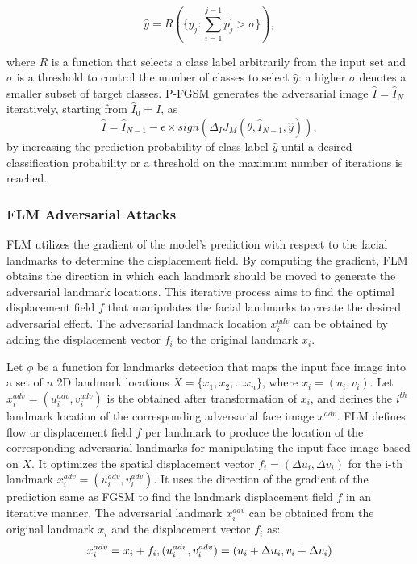 \documentclass[sn-mathphys]{sn-jnl}%
\theoremstyle{thmstyleone}%
\theoremstyle{thmstyletwo}%
\theoremstyle{thmstylethree}%
\begin{document}
\begin{equation}
 \hat y = R (\{y_j: \sum_{i=1}^{j-1} p^{\prime}_j > \sigma \}),
\end{equation}

where $R$ is a function that selects a class label arbitrarily from the input set and $\sigma$ is a threshold to control the number of classes to select $\hat y$: a higher $\sigma$ denotes a smaller subset of target classes. P-FGSM generates the adversarial image $ \hat I = \hat I_N$ iteratively, starting from $\hat I_0 = I$, as
\begin{equation}
 \hat I = \hat I_{N-1} - \epsilon \times sign(\Delta_I J_M(\theta, \hat I_{N-1}, \hat y)),
\end{equation}
by increasing the prediction probability of class label $\hat y$ until a desired classification probability or a threshold on the maximum number of iterations is reached.

\subsubsection{FLM Adversarial Attacks} 
FLM utilizes the gradient of the model's prediction with respect to the facial landmarks to determine the displacement field. By computing the gradient, FLM obtains the direction in which each landmark should be moved to generate the adversarial landmark locations. This iterative process aims to find the optimal displacement field $f$ that manipulates the facial landmarks to create the desired adversarial effect. The adversarial landmark location $x_i^{adv}$ can be obtained by adding the displacement vector $f_i$ to the original landmark $x_i$.

Let $\phi$ be a function for landmarks detection that maps the input face image into a set of $n$ 2D landmark locations $X = \{x_1, x_2,...x_n\}$, where $x_i = (u_i, v_i)$. Let $x^{adv}_i = (u^{adv}_i, v^{adv}_i)$ is the obtained after transformation of $x_i$, and defines the $i^{th}$ landmark location of the corresponding adversarial face image $x^{adv}$. FLM defines flow or displacement field $f$ per landmark to produce the location of the corresponding adversarial landmarks for manipulating the input face image based on $X$. It optimizes the spatial displacement vector $f_i = (\Delta u_i, \Delta v_i)$ for the i-th landmark $x^{adv}_i = (u^{adv}_i, v^{adv}_i)$. It uses the direction of the gradient of the prediction same as FGSM \cite{goodfellow2014explaining} to find the landmark displacement field $f$ in an iterative manner. The adversarial landmark $x^{adv}_i$ can be obtained from the original landmark $x_i$ and the displacement vector $f_i$ as:
\begin{equation}
    x^{adv}_i = x_i + f_i,\\
    (u^{adv}_i, v^{adv}_i) = (u_i + \Delta u_i, v_i + \Delta v_i)
\end{equation}
\end{document}
